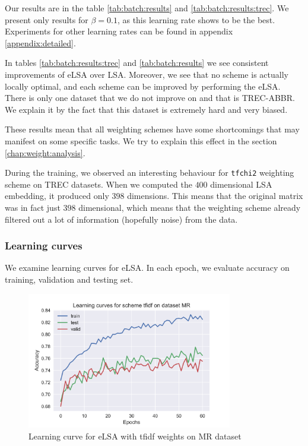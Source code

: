     Our results are in the table \ref{tab:batch:results} and \ref{tab:batch:results:trec}.
    We present only results for $\beta=0.1$, as this learning rate shows to be the best. 
    Experiments for other learning rates can be found in appendix \ref{appendix:detailed}.
    
    

    In tables \ref{tab:batch:results:trec} and \ref{tab:batch:results} we see consistent improvements of eLSA over LSA.
    Moreover, we see that no scheme is actually locally optimal, and each scheme can be improved by performing the eLSA.
    There is only one dataset that we do not improve on and that is TREC-ABBR.
    We explain it by the fact that this dataset is extremely hard and very biased. 
    
    These results mean that all weighting schemes have some shortcomings 
    that may manifest on some specific tasks.  
    We try to explain this effect in the section \ref{chap:weight:analysis}.
    
    During the training, we observed an interesting behaviour for \texttt{tfchi2} weighting scheme on TREC datasets.
    When we computed the $400$ dimensional LSA embedding, it produced only $398$ dimensions. 
    This means that the original matrix was in fact just $398$ dimensional, 
    which means that the weighting scheme already filtered out a lot of information (hopefully noise) from the data. 

    \subsubsection{Learning curves}
    We examine learning curves for eLSA.
    In each epoch, we evaluate accuracy on training, validation and testing set.
    
    \begin{figure}
    \centerline{\includegraphics[width=0.8\textwidth]{images/learning_curve_MR_tfidf}}
    \caption[Learning curve for eLSA with tfidf weights on MR dataset]{Learning curve for eLSA with tfidf weights on MR dataset}
    \label{img:learning:curve}
    \end{figure}

